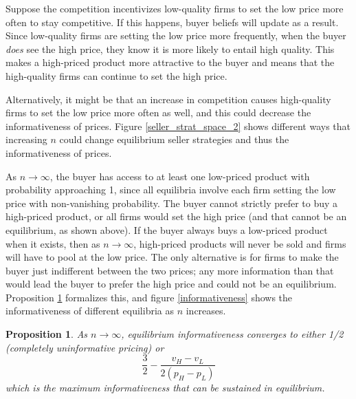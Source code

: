 \documentclass[12pt]{article}
\newtheorem{proposition}{Proposition}
\begin{document}


Suppose the competition incentivizes low-quality firms to set the low price more often to stay competitive. If this happens, buyer beliefs will update as a result. Since low-quality firms are setting the low price more frequently, when the buyer \emph{does} see the high price, they know it is more likely to entail high quality. This makes a high-priced product more attractive to the buyer and means that the high-quality firms can continue to set the high price. 

Alternatively, it might be that an increase in competition causes high-quality firms to set the low price more often as well, and this could decrease the informativeness of prices. Figure \ref{seller_strat_space_2} shows different ways that increasing $n$ could change equilibrium seller strategies and thus the informativeness of prices.



As $n \to \infty$, the buyer has access to at least one low-priced product with probability approaching 1, since all equilibria involve each firm setting the low price with non-vanishing probability. The buyer cannot strictly prefer to buy a high-priced product, or all firms would set the high price (and that cannot be an equilibrium, as shown above). If the buyer always buys a low-priced product when it exists, then as $n \to \infty$, high-priced products will never be sold and firms will have to pool at the low price. The only alternative is for firms to make the buyer just indifferent between the two prices; any more information than that would lead the buyer to prefer the high price and could not be an equilibrium. Proposition \ref{asymptotic_result} formalizes this, and figure \ref{informativeness} shows the informativeness of different equilibria as $n$ increases.

\begin{proposition}
\label{asymptotic_result}
As $n \to \infty$, equilibrium informativeness converges to either 1/2 (completely uninformative pricing) or 
\[ \frac{3}{2} - \frac{v_H - v_L}{2(p_H - p_L)} \]
which is the maximum informativeness that can be sustained in equilibrium.
\end{proposition}


\end{document}
